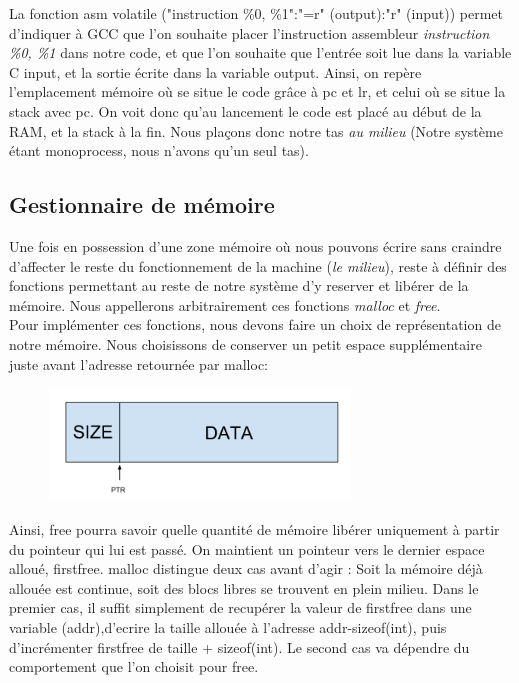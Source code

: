 \documentclass[frenchb]{article}
\begin{document}
\vspace*{-0.8cm}
La fonction \textsf{asm volatile ("instruction \%0, \%1":"=r" (output):"r" (input))} permet d'indiquer à GCC que l'on souhaite placer l'instruction assembleur \textit{instruction \%0, \%1} dans notre code, et que l'on souhaite que l'entrée soit lue dans la variable C input, et la sortie écrite dans la variable output. Ainsi, on repère l'emplacement mémoire où se situe le code grâce à \textsf{pc} et \textsf{lr}, et celui où se situe la stack avec \textsf{pc}. On voit donc qu'au lancement le code est placé au début de la RAM, et la stack à la fin. Nous plaçons donc notre tas \textit{au milieu} (Notre système étant monoprocess, nous n'avons qu'un seul tas).

\subsection{Gestionnaire de mémoire}
Une fois en possession d'une zone mémoire où nous pouvons écrire sans craindre d'affecter le reste du fonctionnement de la machine (\textit{le milieu}), reste à définir des fonctions permettant au reste de notre système d'y reserver et libérer de la mémoire. Nous appellerons arbitrairement ces fonctions \textit{malloc} et \textit{free}.\\
Pour implémenter ces fonctions, nous devons faire un choix de représentation de notre mémoire. Nous choisissons de conserver un petit espace supplémentaire juste avant l'adresse retournée par \textsf{malloc}:\\
\begin{figure}[H]
\centering
\includegraphics[width=8cm]{memblock.png}\\
\end{figure}
Ainsi, \textsf{free} pourra savoir quelle quantité de mémoire libérer uniquement à partir du pointeur qui lui est passé. On maintient un pointeur vers le dernier espace alloué, \textsf{firstfree}. \textsf{malloc} distingue deux cas avant d'agir : Soit la mémoire déjà allouée est continue, soit des blocs libres se trouvent en plein milieu. Dans le premier cas, il suffit simplement de recupérer la valeur de \textsf{firstfree} dans une variable (\textsf{addr}),d'ecrire la taille allouée à l'adresse \textsf{addr-sizeof(int)}, puis d'incrémenter \textsf{firstfree} de \textsf{taille + sizeof(int)}. Le second cas va dépendre du comportement que l'on choisit pour \textsf{free}.\\
\end{document}
